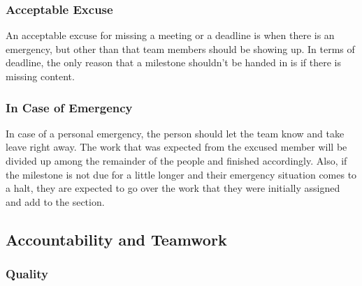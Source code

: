 \documentclass{article}
\begin{document}
\subsubsection*{Acceptable Excuse}

\newline
An acceptable excuse for missing a meeting or a deadline is when there is an emergency, but other than that team members should be showing up. In terms of deadline, the only reason that a milestone shouldn’t be handed in is if there is missing content.


\subsubsection*{In Case of Emergency}

\newline
In case of a personal emergency, the person should let the team know and take leave right away. The work that was expected from the excused member will be divided up among the remainder of the people and finished accordingly. Also, if the milestone is not due for a little longer and their emergency situation comes to a halt, they are expected to go over the work that they were initially assigned and add to the section.

\subsection*{Accountability and Teamwork}

\subsubsection*{Quality} 
\end{document}
